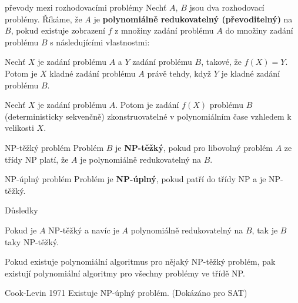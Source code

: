 \begin{definiceN}{převody mezi rozhodovacími problémy}
  Nechť $A$, $B$ jsou dva rozhodovací problémy. Říkáme, že $A$ je
  \textbf{polynomiálně redukovatelný (převoditelný)} na $B$, pokud existuje
  zobrazení $f$ z množiny zadání problému $A$ do množiny zadání problému $B$ s
  následujícími vlastnostmi:
  \begin{pitemize}
    \item Nechť $X$ je zadání problému $A$ a $Y$ zadání problému $B$, takové, že
    $f(X)=Y$. Potom je $X$ kladné zadání problému $A$ právě tehdy, když $Y$ je
    kladné zadání problému $B$.
    \item Nechť $X$ je zadání problému $A$. Potom je zadání $f(X)$ problému $B$
    (deterministicky sekvenčně) zkonstruovatelné v polynomiálním čase vzhledem k
    velikosti $X$.
  \end{pitemize}
\end{definiceN}

\begin{definiceN}{NP-těžký problém}
  Problém $B$ je \textbf{NP-těžký}, pokud pro libovolný problém $A$ ze třídy NP
  platí, že $A$ je polynomiálně redukovatelný na $B$.
\end{definiceN}

\begin{definiceN}{NP-úplný problém}
  Problém je \textbf{NP-úplný}, pokud patří do třídy NP a je NP-těžký.
\end{definiceN}

\begin{obecne}{Důsledky}
  \begin{pitemize}
    \item Pokud je $A$ NP-těžký a navíc je $A$ polynomiálně redukovatelný na $B$, tak je
      $B$ taky NP-těžký.
    \item Pokud existuje polynomiální algoritmus pro nějaký NP-těžký problém, pak
      existují polynomiální algoritmy pro všechny problémy ve třídě NP.
  \end{pitemize}
\end{obecne}

\begin{vetaN}{Cook-Levin 1971}
 Existuje NP-úplný problém. (Dokázáno pro SAT)
\end{vetaN}
